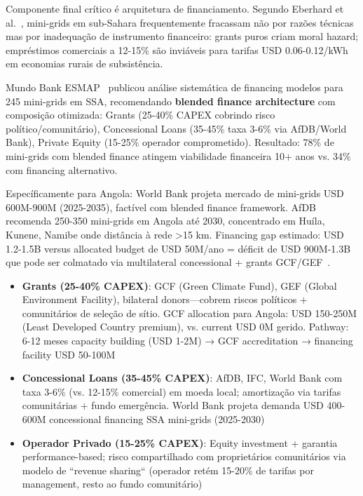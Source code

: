 \documentclass[12pt, a4paper]{article}
\begin{document}
Componente final crítico é arquitetura de financiamento. Segundo Eberhard et al.~\citep{Eberhard2020}, mini-grids em sub-Sahara frequentemente fracassam não por razões técnicas mas por inadequação de instrumento financeiro: grants puros criam moral hazard; empréstimos comerciais a 12-15\% são inviáveis para tarifas USD 0.06-0.12/kWh em economias rurais de subsistência. 

Mundo Bank ESMAP~\citep{WorldBankESMAP2024} publicou análise sistemática de financing modelos para 245 mini-grids em SSA, recomendando \textbf{blended finance architecture} com composição otimizada: Grants (25-40\% CAPEX cobrindo risco político/comunitário), Concessional Loans (35-45\% taxa 3-6\% via AfDB/World Bank), Private Equity (15-25\% operador comprometido). Resultado: 78\% de mini-grids com blended finance atingem viabilidade financeira 10+ anos vs. 34\% com financing alternativo. 

Específicamente para Angola: World Bank projeta mercado de mini-grids USD 600M-900M (2025-2035), factível com blended finance framework. AfDB~\citep{AfDB2024AngolaAssessment} recomenda 250-350 mini-grids em Angola até 2030, concentrado em Huíla, Kunene, Namibe onde distância à rede >15 km. Financing gap estimado: USD 1.2-1.5B versus allocated budget de USD 50M/ano = déficit de USD 900M-1.3B que pode ser colmatado via multilateral concessional + grants GCF/GEF~\citep{GCFMiniGridFramework2024}.

\begin{itemize}
\item \textbf{Grants (25-40\% CAPEX)}: GCF (Green Climate Fund), GEF (Global Environment Facility), bilateral donors—cobrem riscos políticos + comunitários de seleção de sítio. GCF allocation para Angola: USD 150-250M (Least Developed Country premium), vs. current USD 0M gerido. Pathway: 6-12 meses capacity building (USD 1-2M) → GCF accreditation → financing facility USD 50-100M
\item \textbf{Concessional Loans (35-45\% CAPEX)}: AfDB, IFC, World Bank com taxa 3-6\% (vs. 12-15\% comercial) em moeda local; amortização via tarifas comunitárias + fundo emergência. World Bank projeta demanda USD 400-600M concessional financing SSA mini-grids (2025-2030)
\item \textbf{Operador Privado (15-25\% CAPEX)}: Equity investment + garantia performance-based; risco compartilhado com proprietários comunitários via modelo de ``revenue sharing`` (operador retém 15-20\% de tarifas por management, resto ao fundo comunitário)

\end{itemize}
\end{document}
